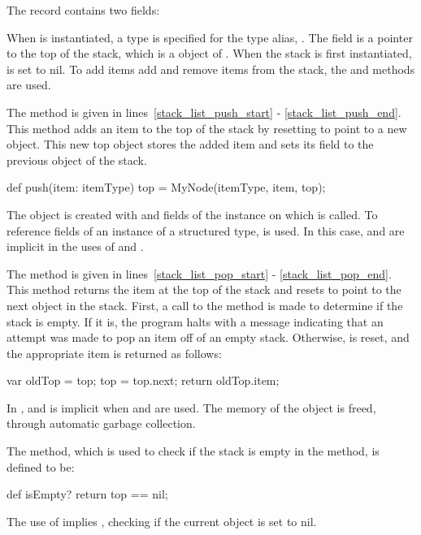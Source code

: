 The  record contains two fields:
\begin{chapel}
record Stack {                      
  type itemType;                   
  var top: MyNode(itemType);      
\end{chapel}
When  is instantiated, a type is specified for the type
alias, .  The  field is a pointer to the top
of the stack, which is a  object of .  When
the stack is first instantiated,  is set to nil.  To add items
add and remove items from the stack, the  and  
methods are used.

The  method is given in lines~\ref{stack_list_push_start} -
\ref{stack_list_push_end}.  This method adds an item to the top of the stack
by resetting  to point to a new  object.  This new
top object stores the added item and sets its  field to the previous
 object of the stack.
\begin{chapel}
  def push(item: itemType) {        
    top = MyNode(itemType, item, top); 
  }                                 
\end{chapel}
The  object is created with  and  fields
of the  instance on which  is called.  To reference
fields of an instance of a structured type,  is used.
In this case,  and  are 
implicit in the uses of  and . 

The  method is given in lines~\ref{stack_list_pop_start} -
\ref{stack_list_pop_end}.  This method returns the item at the top of
the stack and resets  to point to the next object in the stack.
First, a call to the  method  is made to 
determine if the stack is
empty.  If it is, the program halts with a message indicating that 
an attempt was made to pop an item off of an empty stack.  Otherwise,
 is reset, and the appropriate item is returned as follows:
\begin{chapel}
    var oldTop = top;              
    top = top.next;               
    return oldTop.item;          
\end{chapel}
In ,  and  is implicit when
 and  are used.
The memory of the  object is freed, through automatic
garbage collection.

The  method, which is used to check if the stack
is empty in the  method, is defined to be:
\begin{chapel}
  def isEmpty? return top == nil;   
\end{chapel}
The use of  implies , checking if the
current  object is set to nil.


